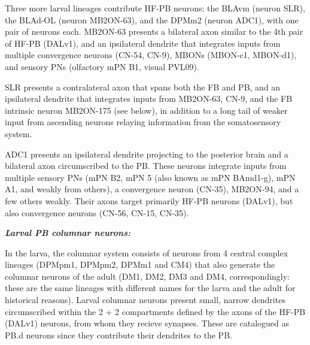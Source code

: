     Three more larval lineages contribute HF-PB neurons: the BLAvm (neuron SLR), the BLAd-OL (neuron MB2ON-63), and the DPMm2 (neuron ADC1),  with one pair of neurons each. 
    MB2ON-63 presents a bilateral axon similar to the 4th pair of HF-PB (DALv1), and an ipsilateral dendrite that integrates inputs from multiple convergence neurons (CN-54, CN-9), MBONs (MBON-c1, MBON-d1), and sensory PNs (olfactory mPN B1, visual PVL09).

    SLR presents a contralateral axon that spans both the FB and PB, and an ipsilateral dendrite that integrates inputs from MB2ON-63, CN-9, and the FB intrinsic neuron MB2ON-175 (see below), in addition to a long tail of weaker input from ascending neurons relaying information from the somatosensory system.

    ADC1 presents an ipsilateral dendrite projecting to the posterior brain and a bilateral axon circumscribed to the PB. These neurons integrate inputs from multiple sensory PNs (mPN B2, mPN 5 (also known as mPN BAmd1-g), mPN A1, and weakly from others), a convergence neuron (CN-35), MB2ON-94, and a few others weakly. Their axons target primarily HF-PB neurons (DALv1), but also convergence neurons  (CN-56, CN-15, CN-35).
 

    \textbf{\textit{Larval PB columnar neurons:}}

    In the larva, the columnar system consists of neurons from 4 central complex lineages (DPMpm1, DPMpm2, DPMm1 and CM4) that also generate the columnar neurons of the adult (DM1, DM2, DM3 and DM4, correspondingly: these are the same lineages with different names for the larva and the adult for historical reasons).
    Larval columnar neurons present small, narrow dendrites circumscribed within the 2 + 2 compartments defined by the axons of the HF-PB (DALv1) neurons, from whom they recieve synapses. These are catalogued as PB.d neurons since they contribute their dendrites to the PB.

